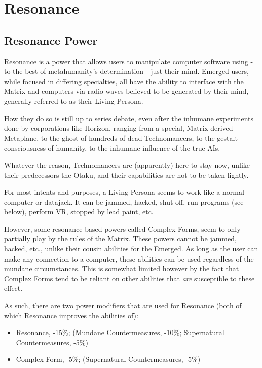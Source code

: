 \section{Resonance}

\begin{multicols*}{3}
	
	\subsection{Resonance Power}
	
	Resonance is a power that allows users to manipulate computer software using - to the best of metahumanity's determination - just their mind. Emerged users, while focused in differing specialties, all have the ability to interface with the Matrix and computers via radio waves believed to be generated by their mind, generally referred to as their Living Persona.
	
	How they do so is still up to series debate, even after the inhumane experiments done by corporations like Horizon, ranging from a special, Matrix derived Metaplane, to the ghost of hundreds of dead Technomancers, to the gestalt consciousness of humanity, to the inhumane influence of the true AIs.
	
	Whatever the reason, Technomancers are (apparently) here to stay now, unlike their predecessors the Otaku, and their capabilities are not to be taken lightly.
	
	For most intents and purposes, a Living Persona seems to work like a normal computer or datajack. It can be jammed, hacked, shut off, run programs (see below), perform VR, stopped by lead paint, etc. 
	
	However, some resonance based powers called Complex Forms, seem to only partially play by the rules of the Matrix. These powers cannot be jammed, hacked, etc., unlike their cousin abilities for the Emerged. As long as the user can make any connection to a computer, these abilities can be used regardless of the mundane circumstances. This is somewhat limited however by the fact that Complex Forms tend to be reliant on other abilities that \textit{are} susceptible to these effect.
	
	As such, there are two power modifiers that are used for Resonance (both of which Resonance improves the abilities of):
	
	\begin{itemize}
		\item Resonance, -15\%; (Mundane Countermeasures, -10\%; Supernatural Countermeasures, -5\%)
		\item Complex Form, -5\%; (Supernatural Countermeasures, -5\%)
	\end{itemize}
	

\end{multicols*}
